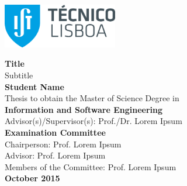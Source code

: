 
\begin{titlepage}
\includegraphics[width=5cm]{images/ist_logo}~\\[2.0cm]
\begin{center}
{\LARGE \textbf{Title}}\\[1.0cm]
{\Large Subtitle}\\[1.0cm]
{\Large \textbf{Student Name}}\\[1.0cm]
{\large Thesis to obtain the Master of Science Degree in}\\[1.0cm]
{\LARGE \textbf{Information and Software Engineering}}\\[1.0cm]

{\large Advisor(s)/Supervisor(s): Prof./Dr. Lorem Ipsum}\\[1.0cm]

{\Large \textbf{Examination Committee}}\\
{\large Chairperson: Prof. Lorem Ipsum}\\
{\large Advisor: Prof. Lorem Ipsum}\\
{\large Members of the Committee: Prof. Lorem Ipsum}\\[1.0cm]

{\Large \textbf{October 2015}}\\
\end{center}
\end{titlepage}
